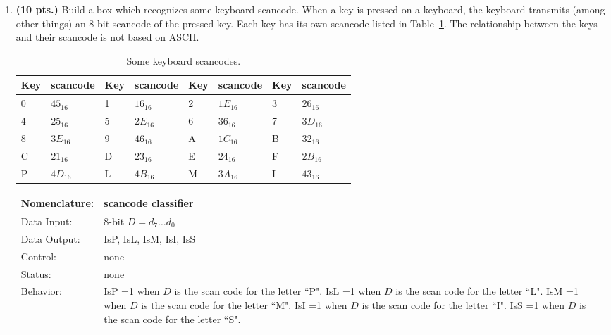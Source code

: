 \begin{enumerate}
\begin{onlysolution} \textbf{Solutions} \itshape {
Arrange 8, 2:1 muxes with $d_i$ and $d_i'$ going into the data inputs.
Run the select into a 3:8 decoder and route the data outputs to the 
individual selects of the 2:1 muxes.
} \end{onlysolution} 


\item \textbf{ (10 pts.)}
\label{page:IsScan}
Build a box which recognizes some keyboard scancode.  When a key is 
pressed on a keyboard, the keyboard transmits (among other things) 
an 8-bit scancode of the pressed key.  Each key has its own scancode 
listed in Table~\ref{table:scancodes}.  The relationship between the 
keys and their scancode is not based on ASCII.

\begin{table}
\begin{tabular}{|l|l||l|l||l|l||l|l|} \hline
Key & scancode & Key & scancode & Key & scancode & Key & scancode \\ \hline \hline 
0 & $45_{16}$ & 1 & $16_{16}$ & 2 & $1E_{16}$ & 3 & $26_{16}$ \\ \hline
4 & $25_{16}$ & 5 & $2E_{16}$ & 6 & $36_{16}$ & 7 & $3D_{16}$ \\ \hline
8 & $3E_{16}$ & 9 & $46_{16}$ & A & $1C_{16}$ & B & $32_{16}$ \\ \hline
C & $21_{16}$ & D & $23_{16}$ & E & $24_{16}$ & F & $2B_{16}$ \\ \hline
P & $4D_{16}$ & L & $4B_{16}$ & M & $3A_{16}$ & I & $43_{16}$ \\ \hline
\end{tabular}
\caption{Some keyboard scancodes.}
\label{table:scancodes}
\end{table}

\label{page:scanclass}
\begin{tabular}{|l|p{3.5in}|} \hline
Nomenclature:  & scancode classifier                   \\ \hline
Data Input:    & 8-bit $D=d_7 \ldots d_0$          \\ \hline
Data Output:   & IsP, IsL, IsM, IsI, IsS \\ \hline
Control:       & none             \\ \hline
Status:        & none                                   \\ \hline
Behavior:      & IsP =1 when $D$ is the scan code for the letter ``P".
		 IsL =1 when $D$ is the scan code for the letter ``L".
		 IsM =1 when $D$ is the scan code for the letter ``M".
		 IsI =1 when $D$ is the scan code for the letter ``I".
		 IsS =1 when $D$ is the scan code for the letter ``S".  \\ \hline
\end{tabular}


\end{enumerate}
